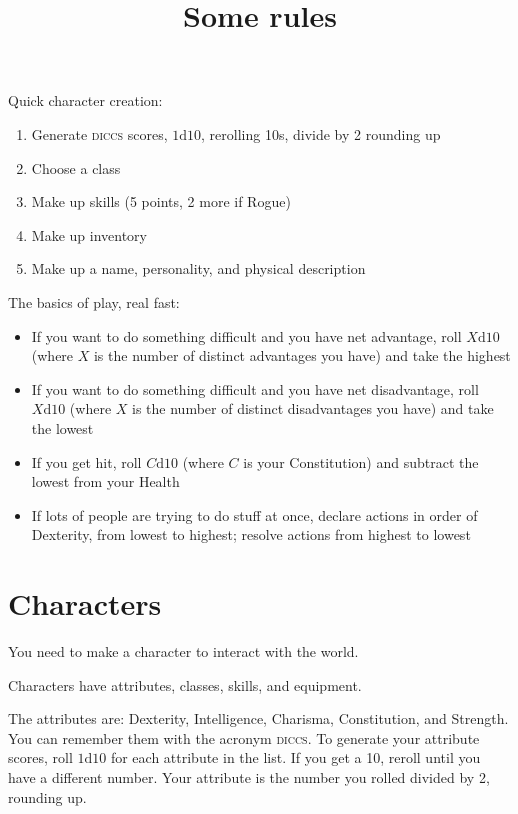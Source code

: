\documentclass[twocolumn]{amsart}
\title{Some rules}
\date{}
\newcommand{\die}{\text{d}}
\begin{document}
\maketitle

Quick character creation:

\begin{enumerate}
\item Generate \textsc{diccs} scores, $1\die10$, rerolling 10s, divide by 2 rounding up
\item Choose a class
\item Make up skills (5 points, 2 more if Rogue)
\item Make up inventory
\item Make up a name, personality, and physical description
\end{enumerate}

The basics of play, real fast:

\begin{itemize}
\item If you want to do something difficult and you have net advantage, roll $X\die10$ (where $X$ is the number of distinct advantages you have) and take the highest
\item If you want to do something difficult and you have net disadvantage, roll $X\die10$ (where $X$ is the number of distinct disadvantages you have) and take the lowest
\item If you get hit, roll $C\die10$ (where $C$ is your Constitution) and subtract the lowest from your Health
\item If lots of people are trying to do stuff at once, declare actions in order of Dexterity, from lowest to highest; resolve actions from highest to lowest
\end{itemize}

\section{Characters}

You need to make a character to interact with the world.

Characters have attributes, classes, skills, and equipment.

The attributes are: Dexterity, Intelligence, Charisma, Constitution, and Strength.
You can remember them with the acronym \textsc{diccs}.
To generate your attribute scores, roll $1\die10$ for each attribute in the list.\footnotemark
If you get a 10, reroll until you have a different number.
Your attribute is the number you rolled divided by 2, rounding up.
\end{document}
